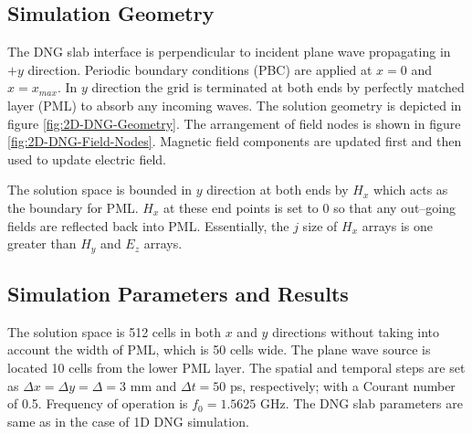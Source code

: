 \documentclass{article}
\begin{document}
\subsection{Simulation Geometry}
The DNG slab interface is perpendicular to incident plane wave propagating in $+y$ direction. Periodic boundary conditions (PBC) are applied at $x=0$ and $x=x_{max}$. In $y$ direction the grid is terminated at both ends by perfectly matched layer (PML) to absorb any incoming waves. The solution geometry is depicted in figure \ref{fig:2D-DNG-Geometry}. The arrangement of field nodes is shown in figure \ref{fig:2D-DNG-Field-Nodes}.  Magnetic field components are updated first and then used to update electric field.

The solution space is bounded in $y$ direction at both ends by $H_x$ which acts as the boundary for PML. $H_x$ at these end points is set to 0 so that any out--going fields are reflected back into PML. Essentially, the $j$ size of $H_x$ arrays is one greater than $H_y$ and $E_z$ arrays.
\subsection{Simulation Parameters and Results}
The solution space is 512 cells in both $x$ and $y$ directions without taking into account the width of PML, which is 50 cells wide. The plane wave source is located 10 cells from the lower PML layer. The spatial and temporal steps are set as $\Delta x=\Delta y=\Delta=3$ mm and $\Delta t=50$ ps, respectively; with a Courant number of 0.5. Frequency of operation is $f_0=1.5625$ GHz. The DNG slab parameters are same as in the case of 1D DNG simulation.
\end{document}
